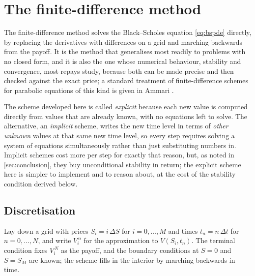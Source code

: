 \documentclass[11pt,a4paper]{article}
\numberwithin{equation}{section}
\theoremstyle{definition}
\theoremstyle{plain}
\theoremstyle{remark}
\begin{document}
\clearpage
\section{The finite-difference method}\label{sec:pde}

The finite-difference method solves the Black--Scholes equation \eqref{eq:bspde}
directly, by replacing the derivatives with differences on a grid and marching
backwards from the payoff. It is the method that generalises most readily to
problems with no closed form, and it is also the one whose numerical behaviour,
stability and convergence, most repays study, because both can be made precise
and then checked against the exact price; a standard treatment of finite-difference
schemes for parabolic equations of this kind is given in Ammari \cite{ammari}.

The scheme developed here is called \emph{explicit} because each new value is
computed directly from values that are already known, with no equations left
to solve. The alternative, an \emph{implicit} scheme, writes the new time
level in terms of \emph{other unknown} values at that same new time level, so
every step requires solving a system of equations simultaneously rather than
just substituting numbers in. Implicit schemes cost more per step for exactly
that reason, but, as noted in \cref{sec:conclusion}, they buy unconditional
stability in return; the explicit scheme here is simpler to implement and to
reason about, at the cost of the stability condition derived below.

\subsection{Discretisation}

Lay down a grid with prices $S_i = i\,\Delta S$ for $i = 0,\dots,M$ and times
$t_n = n\,\Delta t$ for $n = 0,\dots,N$, and write $V_i^{\,n}$ for the
approximation to $V(S_i,t_n)$. The terminal condition fixes $V_i^{\,N}$ as the
payoff, and the boundary conditions at $S=0$ and $S = S_M$ are known; the scheme
fills in the interior by marching backwards in time.
\end{document}
